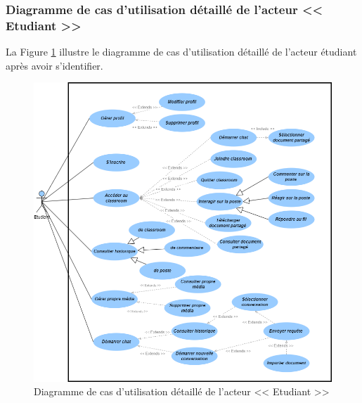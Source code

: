 \subsubsection{Diagramme de cas d’utilisation détaillé de l’acteur << Etudiant >>}
La Figure \ref{fig:diagramme de cas d’utilisation détaillé de l’acteur << Etudiant >>} illustre le diagramme de cas d’utilisation détaillé de l’acteur étudiant après avoir s’identifier.
\begin{figure}[H]
    \centering
    \includegraphics[width=1.1\textwidth,height=0.85\textheight]{images/chp3/fig3.png}
    \caption{Diagramme de cas d’utilisation détaillé de l’acteur << Etudiant >>}
    \label{fig:diagramme de cas d’utilisation détaillé de l’acteur << Etudiant >>}    
\end{figure}

